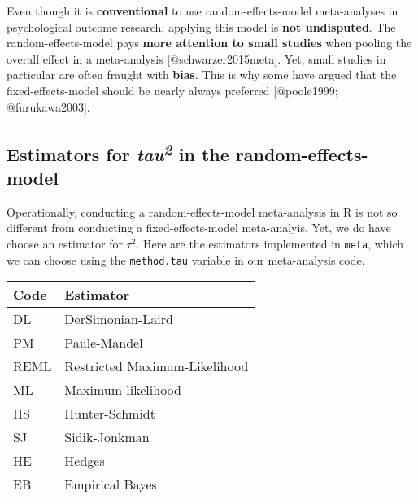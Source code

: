 \documentclass[]{book}
\theoremstyle{definition}
\theoremstyle{definition}
\theoremstyle{definition}
\theoremstyle{remark}
\begin{document}
\begin{rmdachtung}
Even though it is \textbf{conventional} to use random-effects-model
meta-analyses in psychological outcome research, applying this model is
\textbf{not undisputed}. The random-effects-model pays \textbf{more
attention to small studies} when pooling the overall effect in a
meta-analysis {[}@schwarzer2015meta{]}. Yet, small studies in particular
are often fraught with \textbf{bias}. This is why some have argued that
the fixed-effects-model should be nearly always preferred {[}@poole1999;
@furukawa2003{]}.
\end{rmdachtung}

\subsection{\texorpdfstring{Estimators for \emph{tau\textsuperscript{2}}
in the
random-effects-model}{Estimators for tau2 in the random-effects-model}}\label{tau2}

Operationally, conducting a random-effects-model meta-analysis in R is
not so different from conducting a fixed-effects-model meta-analyis.
Yet, we do have choose an estimator for \(\tau^{2}\). Here are the
estimators implemented in \texttt{meta}, which we can choose using the
\texttt{method.tau} variable in our meta-analysis code.

\begin{tabular}{l|l}
\hline
Code & Estimator\\
\hline
DL & DerSimonian-Laird\\
\hline
PM & Paule-Mandel\\
\hline
REML & Restricted Maximum-Likelihood\\
\hline
ML & Maximum-likelihood\\
\hline
HS & Hunter-Schmidt\\
\hline
SJ & Sidik-Jonkman\\
\hline
HE & Hedges\\
\hline
EB & Empirical Bayes\\
\hline
\end{tabular}
\end{document}
